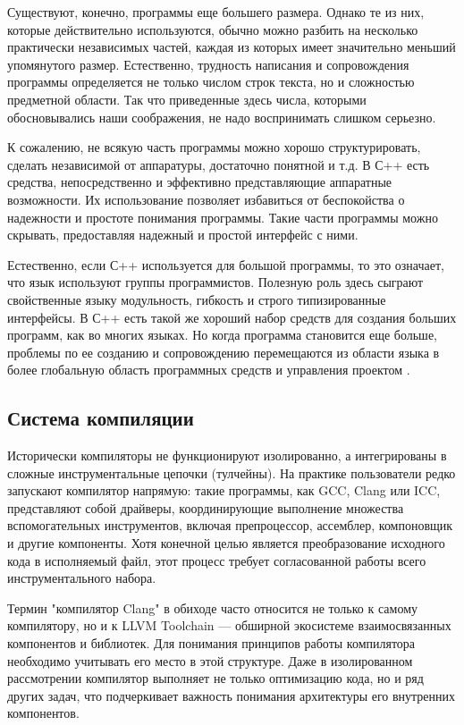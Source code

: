 Существуют, конечно, программы еще большего размера. Однако те из них, которые действительно используются, обычно можно разбить на несколько практически независимых частей, каждая из которых имеет значительно меньший упомянутого размер. Естественно, трудность написания и сопровождения программы определяется не только числом строк текста, но и сложностью предметной области. Так что приведенные здесь числа, которыми обосновывались наши соображения, не надо воспринимать слишком серьезно.

К сожалению, не всякую часть программы можно хорошо структурировать, сделать независимой от аппаратуры, достаточно понятной и т.д. В С++ есть средства, непосредственно и эффективно представляющие аппаратные возможности. Их использование позволяет избавиться от беспокойства о надежности и простоте понимания программы. Такие части программы можно скрывать, предоставляя надежный и простой интерфейс с ними.

Естественно, если С++ используется для большой программы, то это означает, что язык используют группы программистов. Полезную роль здесь сыграют свойственные языку модульность, гибкость и строго типизированные интерфейсы. В С++ есть такой же хороший набор средств для создания больших программ, как во многих языках. Но когда программа становится еще больше, проблемы по ее созданию и сопровождению перемещаются из области языка в более глобальную область программных средств и управления проектом \cite{StroustrupCpp}.


\subsection{Система компиляции}

Исторически компиляторы не функционируют изолированно, а интегрированы в сложные инструментальные цепочки (тулчейны). На практике пользователи редко запускают компилятор напрямую: такие программы, как GCC, Clang или ICC, представляют собой драйверы, координирующие выполнение множества вспомогательных инструментов, включая препроцессор, ассемблер, компоновщик и другие компоненты. Хотя конечной целью является преобразование исходного кода в исполняемый файл, этот процесс требует согласованной работы всего инструментального набора.

Термин "компилятор Clang" в обиходе часто относится не только к самому компилятору, но и к LLVM Toolchain — обширной экосистеме взаимосвязанных компонентов и библиотек. Для понимания принципов работы компилятора необходимо учитывать его место в этой структуре. Даже в изолированном рассмотрении компилятор выполняет не только оптимизацию кода, но и ряд других задач, что подчеркивает важность понимания архитектуры его внутренних компонентов.

